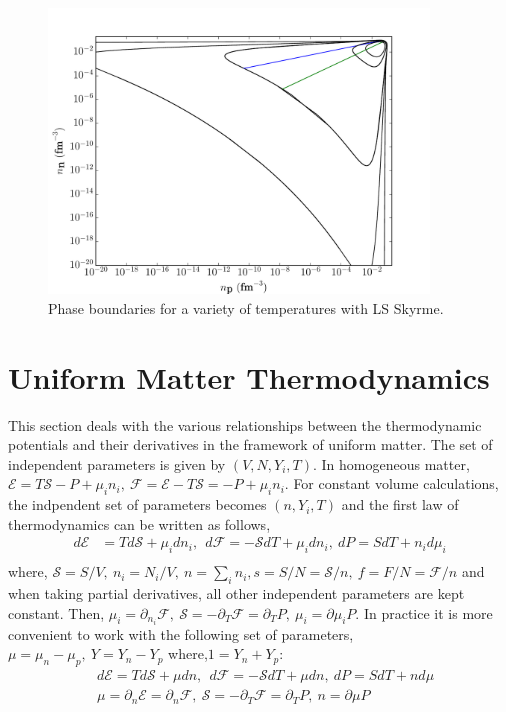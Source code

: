 \documentclass[11pt,letter]{article}
\begin{document}
\begin{figure}[t]
\centering
\includegraphics[width=0.9\textwidth]{PhaseBoundaryDensity.pdf}
\vspace*{-0.35cm}
\caption{ Phase boundaries for a variety of temperatures with LS Skyrme.}
\vspace*{-0.7cm}
\end{figure}

\section{Uniform Matter Thermodynamics}
This section deals with the various relationships between the thermodynamic potentials and their derivatives in the framework of uniform matter.
The set of independent parameters is given by $(V,N,Y_i,T)$.
In homogeneous matter, $\mathcal{E}=T\mathcal{S} -P+ \mu_i n_i,\ \mathcal{F} =\mathcal{E} - T\mathcal{S} = -P + \mu_i n_i$.
For constant volume calculations, the indpendent set of parameters becomes 
$(n,Y_i,T)$ and the first law of thermodynamics can be written
as follows,
\begin{equation}
 \begin{split}
  d\mathcal{E}&=Td\mathcal{S}+\mu_i d n_i,\ \ d\mathcal{F} = -\mathcal{S}dT+\mu_i d n_i,\ dP = S dT + n_i d\mu_i\\
 \end{split}
\end{equation}
where, $ \mathcal{S}= S/V,\ n_i=N_i/V,\ n = \sum_i n_i, s= S/N = \mathcal{S}/n,\ f= F/N=\mathcal{F}/n$ and when taking partial derivatives, all other 
independent parameters are kept constant.
Then, $ \mu_i =\partial_{n_i}\mathcal{F},\  \mathcal{S}=-\partial_{T}\mathcal{F}=\partial_T P, \ \mu_i = \partial \mu_i P$.
In practice it is more convenient to work with the following set of parameters, $\mu=\mu_n-\mu_p,\ Y = Y_n-Y_p$ where,$1 = Y_n+Y_p$:
\begin{equation}
 \begin{split}
  &d\mathcal{E}=Td\mathcal{S}+\mu d n,\ \ d\mathcal{F} = -\mathcal{S}dT+\mu d n,\ dP = S dT + n d\mu\\
  &\mu =\partial_{n}\mathcal{E}=\partial_{n}\mathcal{F},\  \mathcal{S}=-\partial_{T}\mathcal{F}=\partial_T P, \ n = \partial \mu P
 \end{split}
\end{equation}
\end{document}
